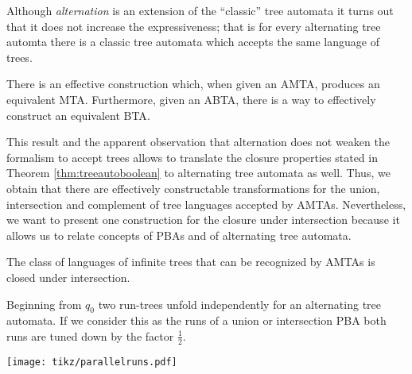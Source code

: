 Although \emph{alternation} is an extension of the \enquote{classic} tree 
automata it turns out that it does not increase the expressiveness; that is
for every alternating tree automta there is a classic tree automata which 
accepts the same language of trees.
\begin{theorem}
  \cite[Theorem 1.2]{SimAltTreeAuto}
  There is an effective construction which, when given an \ac{AMTA}, produces 
  an equivalent \ac{MTA}. Furthermore, given an \ac{ABTA}, there is a way to 
  effectively construct an equivalent \ac{BTA}.
  \label{thm:treesimulation}
\end{theorem}
This result and the apparent observation that alternation does not weaken the 
formalism to accept trees allows to translate the closure properties stated in 
Theorem \ref{thm:treeautoboolean} to alternating tree automata as well. Thus, 
we obtain that there are effectively constructable transformations for the 
union, intersection and complement of tree languages accepted by \acp{AMTA}. 
Nevertheless, we want to present one construction for the closure under 
intersection because it allows us to relate concepts of \acp{PBA} and of
alternating tree automata.
\begin{corollary}
  The class of languages of infinite trees that can be recognized by \acp{AMTA}
  is closed under intersection.
  \label{cor:treeintersection}
\end{corollary}
\begin{drawing}
  \caption{Beginning from $q_{0}$ two run-trees unfold independently for an
  alternating tree automata. If we consider this as the runs of a union or
  intersection \ac{PBA} both runs are tuned down by the factor $\frac{1}{2}$.}
  \label{fig:parallelruns}
  \begin{center}
    \texttt{[image: tikz/parallelruns.pdf]}
  \end{center}
\end{drawing}
